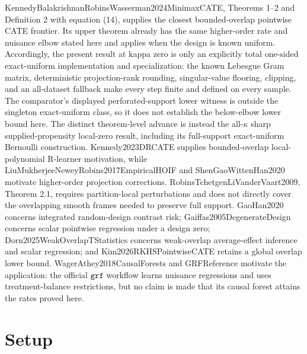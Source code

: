 \documentclass{article}
\begin{document}
KennedyBalakrishnanRobinsWasserman2024MinimaxCATE, Theorems 1--2 and Definition 2 with equation (14), supplies the closest bounded-overlap pointwise CATE frontier.  Its upper theorem already has the same higher-order rate and nuisance elbow stated here and applies when the design is known uniform.  Accordingly, the present result at kappa zero is only an explicitly total one-sided exact-uniform implementation and specialization: the known Lebesgue Gram matrix, deterministic projection-rank rounding, singular-value flooring, clipping, and an all-dataset fallback make every step finite and defined on every sample.  The comparator's displayed perforated-support lower witness is outside the singleton exact-uniform class, so it does not establish the below-elbow lower bound here.  The distinct theorem-level advance is instead the all-\(\kappa\) sharp supplied-propensity local-zero result, including its full-support exact-uniform Bernoulli construction.  Kennedy2023DRCATE supplies bounded-overlap local-polynomial R-learner motivation, while LiuMukherjeeNeweyRobins2017EmpiricalHOIF and ShenGaoWittenHan2020 motivate higher-order projection corrections.  RobinsTchetgenLiVanderVaart2009, Theorem 2.1, requires partition-local perturbations and does not directly cover the overlapping smooth frames needed to preserve full support.  GaoHan2020 concerns integrated random-design contrast risk; Gaiffas2005DegenerateDesign concerns scalar pointwise regression under a design zero; Dorn2025WeakOverlapTStatistics concerns weak-overlap average-effect inference and scalar regression; and Kim2026RKHSPointwiseCATE retains a global overlap lower bound.  WagerAthey2018CausalForests and GRFReference motivate the application: the official \(\texttt{grf}\) workflow learns nuisance regressions and uses treatment-balance restrictions, but no claim is made that its causal forest attains the rates proved here.

\section{Setup}
\end{document}
